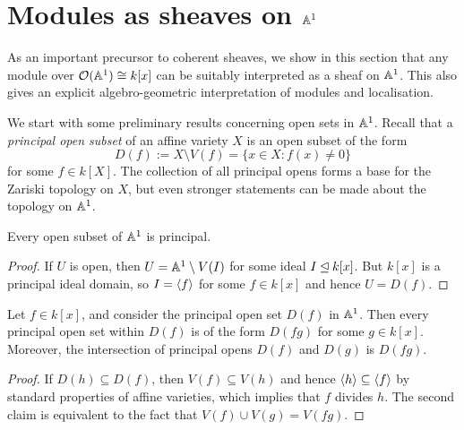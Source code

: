 \section{Modules as sheaves on $\mathbb{A}^{{1}}$}

As an important precursor to coherent sheaves, we show in this
section that any module over $\mathcal{O}(\mathbb{A}^{{1}}) \cong k[x]$ can be
suitably interpreted as a sheaf on $\mathbb{A}^{{1}}$.
This also gives an explicit algebro-geometric interpretation of
modules and localisation.

We start with some preliminary results concerning open sets in $\mathbb{A}^{{1}}$.
Recall that a \emph{principal open subset} of an affine variety $X$
is an open subset of the form
\[
  D(f) := X \setminus V(f) = \{x \in X: f(x) \neq 0\}
\]
for some $f \in k[X]$.
The collection of all principal opens forms a base for the Zariski
topology on $X$, but even stronger statements can be made about the
topology on $\mathbb{A}^{{1}}$.

\begin{lemma}
  \label{lemma_opens_of_aff_line_are_principal}
  Every open subset of $\mathbb{A}^{{1}}$ is principal.
\end{lemma}

\begin{proof}
  If $U$ is open, then $U = \mathbb{A}^{{1}} \setminus V(I)$ for some ideal $I
  \unlhd k[x]$.
  But $k[x]$ is a principal ideal domain, so $I = \left\langle {f} \right\rangle$ for some
  $f \in k[x]$ and hence $U = D(f)$.
\end{proof}

\begin{lemma}
  \label{lemma_principal_open_inclusions_of_aff_line}
  Let $f \in k[x]$, and consider the principal open set $D(f)$ in $\mathbb{A}^{{1}}$.
  Then every principal open set within $D(f)$ is of the form $D(fg)$
  for some $g \in k[x]$.
  Moreover, the intersection of principal opens $D(f)$ and $D(g)$ is $D(fg)$.
\end{lemma}

\begin{proof}
  If $D(h) \subseteq D(f)$, then $V(f) \subseteq V(h)$ and hence
  $\left\langle {h} \right\rangle \subseteq \left\langle {f} \right\rangle$ by standard properties of affine
  varieties, which implies that $f$ divides $h$.
  The second claim is equivalent to the fact that $V(f) \cup V(g) = V(fg)$.
\end{proof}

